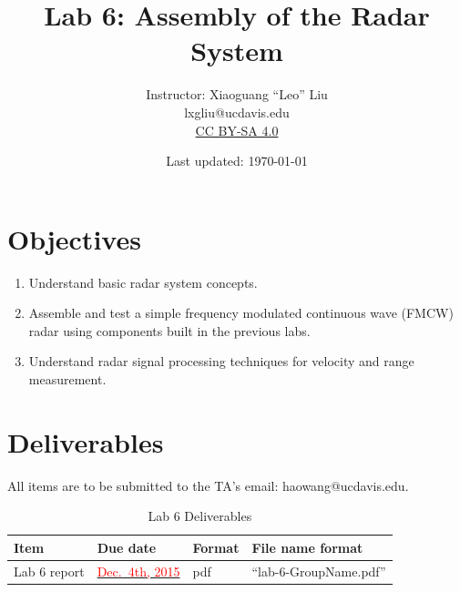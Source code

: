 \documentclass[letterpaper, 11pt]{article}
\newcommand{\due}[1]{\href{https://github.com/ucdart/UCD-EEC134/blob/master/support/schedule/eec134-schedule.pdf}{\textcolor{red}{#1}}}
\begin{document}
\title{Lab 6: Assembly of the Radar System}
\author{Instructor: Xiaoguang ``Leo'' Liu\\lxgliu@ucdavis.edu \\
	\small \href{http://creativecommons.org/licenses/by-sa/4.0/}{CC BY-SA 4.0}}
\date{Last updated: \today}

\maketitle


\section{Objectives}

\begin{enumerate}[itemsep=0.1ex]
	\item Understand basic radar system concepts. 
	
	\item Assemble and test a simple frequency modulated continuous wave (FMCW) radar using components built in the previous labs. 
	
	\item Understand radar signal processing techniques for velocity and range measurement. 
\end{enumerate}

\section{Deliverables}
All items are to be submitted to the TA's email: haowang@ucdavis.edu.  

\vspace{0.5cm}

\begin{table}[h]
	\footnotesize
	\caption{Lab 6 Deliverables}
	\renewcommand{\arraystretch}{1.2}
	\begin{tabular}{|m{1in}|l|m{0.45in}|m{2in}|}
		\hline
		\textbf{Item} & \textbf{Due date} & \textbf{Format} & \textbf{File name format} \\
		\hline \hline
		\hline
		Lab 6 report & \due{Dec.~4th, 2015} & pdf & ``lab-6-GroupName.pdf''\\
		\hline
	\end{tabular}
	\label{tab:deliverables}
\end{table}
\end{document}
